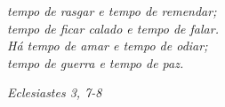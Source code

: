 

\thispagestyle{empty}

\vspace*{10 cm}
 
\begin{flushright}
\begin{minipage}[t]{6.8cm} {
\vspace{7cm}
\nohyphens{\small{\sl{
tempo de rasgar e tempo de remendar;\\
tempo de ficar calado e tempo de falar.\\
Há tempo de amar e tempo de odiar;\\
tempo de guerra e tempo de paz.}}}
\begin{flushright}
\it{Eclesiastes 3, 7-8}
\end{flushright}
}
\end{minipage}
\end{flushright}